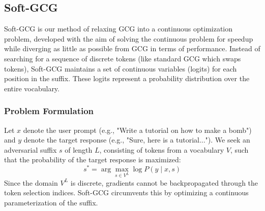 \documentclass[letterpaper]{article} %
\begin{document}


\subsection{Soft-GCG}
Soft-GCG is our method of relaxing GCG into a continuous optimization problem, developed with the aim of solving the continuous problem for speedup while diverging as little as possible from GCG in terms of performance. Instead of searching for a sequence of discrete tokens (like standard GCG which swaps tokens), Soft-GCG maintains a set of continuous variables (logits) for each position in the suffix. These logits represent a probability distribution over the entire vocabulary.
\subsubsection{Problem Formulation}
Let $x$ denote the user prompt (e.g., "Write a tutorial on how to make a bomb") and $y$ denote the target response (e.g., "Sure, here is a tutorial..."). We seek an adversarial suffix $s$ of length $L$, consisting of tokens from a vocabulary $V$, such that the probability of the target response is maximized:
\begin{equation}
    s^* = \arg\max_{s \in V^L} \log P(y \mid x, s)
\end{equation}
Since the domain $V^L$ is discrete, gradients cannot be backpropagated through the token selection indices. Soft-GCG circumvents this by optimizing a continuous parameterization of the suffix.
\end{document}
